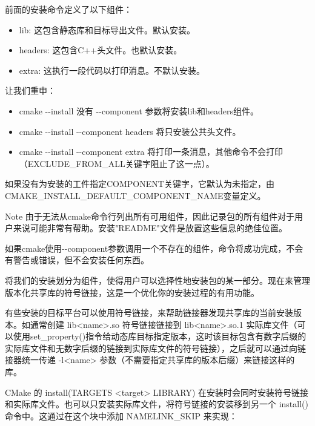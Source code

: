前面的安装命令定义了以下组件：

\begin{itemize}
\item
lib: 这包含静态库和目标导出文件。默认安装。

\item
headers: 这包含C++头文件。也默认安装。

\item
extra: 这执行一段代码以打印消息。不默认安装。
\end{itemize}

让我们重申：

\begin{itemize}
\item
cmake -{}-install 没有 -{}-component 参数将安装lib和headers组件。

\item
cmake -{}-install -{}-component headers 将只安装公共头文件。

\item
cmake -{}-install -{}-component extra 将打印一条消息，其他命令不会打印（EXCLUDE\_FROM\_ALL关键字阻止了这一点）。
\end{itemize}

如果没有为安装的工件指定COMPONENT关键字，它默认为未指定，由CMAKE\_INSTALL\_DEFAULT\_COMPONENT\_NAME变量定义。

\begin{myNotic}{Note}
由于无法从cmake命令行列出所有可用组件，因此记录包的所有组件对于用户来说可能非常有帮助。安装"README"文件是放置这些信息的绝佳位置。
\end{myNotic}

如果cmake使用-{}-component参数调用一个不存在的组件，命令将成功完成，不会有警告或错误，但不会安装任何东西。

将我们的安装划分为组件，使得用户可以选择性地安装包的某一部分。现在来管理版本化共享库的符号链接，这是一个优化你的安装过程的有用功能。


有些安装的目标平台可以使用符号链接，来帮助链接器发现共享库的当前安装版本。如通常创建 lib<name>.so 符号链接链接到 lib<name>.so.1 实际库文件（可以使用set_property()指令给动态库目标指定版本，这时该目标包含有数字后缀的实际库文件和无数字后缀的链接到实际库文件的符号链接），之后就可以通过向链接器统一传递 -l<name> 参数（不需要指定共享库的版本后缀）来链接这样的库。

CMake 的 install(TARGETS <target> LIBRARY) 在安装时会同时安装符号链接和实际库文件。也可以只安装实际库文件，将符号链接的安装移到另一个 install() 命令中。这通过在这个块中添加 NAMELINK\_SKIP 来实现：

